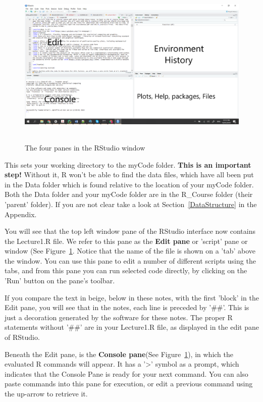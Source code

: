 \documentclass[titlepage]{book}\usepackage{knitr}
\begin{document}
\begin{figure}[!ht]
\graphicspath{{./Images/}}
\includegraphics[width = 16cm, height = 8cm]{Screenshot1.png}
\caption{The four panes in the RStudio window}
\label{fig:Screenshot}
\end{figure}

This sets your working directory to the myCode folder. \textbf{This is an important step!}  Without it, R won't be able to find the data files, which have all been put in the Data folder which is found relative to the location of your myCode folder. Both the Data folder and your myCode folder are in the R\_Course folder (their 'parent' folder). If you are not clear take a look at Section~\ref{DataStructure} in the Appendix.

You will see that the top left window pane of the RStudio interface now contains the Lecture1.R file.   We refer  to this pane as the \textbf{Edit pane} or 'script' pane or window (See Figure~\ref{fig:Screenshot}.  Notice that the name of the file is shown on a 'tab' above the window. You can use this pane to edit a number of different scripts using the tabs, and from this pane you can run selected code directly, by clicking on the 'Run' button on the pane's toolbar.

If you compare the text in beige, below in these notes, with the first 'block' in the Edit pane, you will see that in the notes, each line is preceded by '\#\#'. This is just a decoration generated by the software for these notes. The proper R statements without '\#\#' are in your Lecture1.R file, as displayed in the edit pane of RStudio.

Beneath the Edit pane, is the \textbf{Console pane}(See Figure~\ref{fig:Screenshot}), in which the evaluated R commands will appear. It has a '>' symbol as a prompt, which indicates that the Console Pane is ready for your next command.  You can also paste commands into this pane for execution, or edit a previous command using the up-arrow to retrieve it. 
\end{document}
